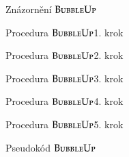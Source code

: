 \documentclass[11pt,professionalfont,aspectratio=43]{beamer}
\begin{document}
    \begin{frame}{Znázornění $\textsc{BubbleUp}$}
    \end{frame}

    \begin{frame}{Procedura $\textsc{BubbleUp}$}{1. krok}
        \centering
    \end{frame}

    \begin{frame}{Procedura $\textsc{BubbleUp}$}{2. krok}
        \centering
    \end{frame}

    \begin{frame}{Procedura $\textsc{BubbleUp}$}{3. krok}
        \centering
    \end{frame}

    \begin{frame}{Procedura $\textsc{BubbleUp}$}{4. krok}
        \centering
    \end{frame}

    \begin{frame}{Procedura $\textsc{BubbleUp}$}{5. krok}
        \centering
    \end{frame}

    \begin{frame}{Pseudokód $\textsc{BubbleUp}$}
        \begin{center}
            \begin{minipage}{0.8\textwidth}
                \begin{algorithm}[H]
                    \caption{$\textsc{BubbleUp}$ (oprava haldy směrem nahoru)}
                \end{algorithm}
            \end{minipage}
        \end{center}
    \end{frame}
\end{document}
